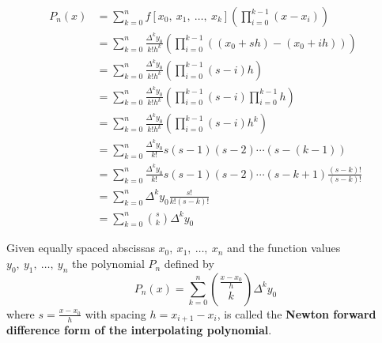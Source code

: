 \documentclass{article}
\begin{document}
\begin{align*}
    P_n\left( x \right) & = \sum_{k = 0}^n f\left[ x_0,\: x_1,\: \dots,\: x_k \right] \left( \prod_{i = 0}^{k - 1} \left( x - x_i \right) \right)                                                 \\
                        & = \sum_{k = 0}^n \frac{\Delta^k y_0}{k! h^k} \left( \prod_{i = 0}^{k - 1} \left( \left( x_0 + sh \right) - \left( x_0 + ih \right) \right) \right)                      \\
                        & = \sum_{k = 0}^n \frac{\Delta^k y_0}{k! h^k} \left( \prod_{i = 0}^{k - 1} \left( s - i \right)h \right)                                                                 \\
                        & = \sum_{k = 0}^n \frac{\Delta^k y_0}{k! h^k} \left( \prod_{i = 0}^{k - 1} \left( s - i \right) \prod_{i = 0}^{k - 1} h \right)                                          \\
                        & = \sum_{k = 0}^n \frac{\Delta^k y_0}{k! h^k} \left( \prod_{i = 0}^{k - 1} \left( s - i \right) h^k \right)                                                              \\
                        & = \sum_{k = 0}^n \frac{\Delta^k y_0}{k!} s\left( s - 1 \right) \left( s - 2 \right) \cdots \left( s - \left( k - 1 \right) \right)                                      \\
                        & = \sum_{k = 0}^n \frac{\Delta^k y_0}{k!} s\left( s - 1 \right) \left( s - 2 \right) \cdots \left( s - k + 1 \right) \frac{\left( s - k \right)!}{\left( s - k \right)!} \\
                        & = \sum_{k = 0}^n \Delta^k y_0 \frac{s!}{k!\left( s - k \right)!}                                                                                                        \\
                        & = \sum_{k = 0}^n \binom{s}{k} \Delta^k y_0
\end{align*}
\begin{definition}
    Given equally spaced abscissas \(x_0,\: x_1,\: \dots,\: x_n\) and the function values \(y_0,\: y_1,\: \dots,\: y_n\) the polynomial \(P_n\) defined by
    \begin{equation*}
        P_n\left( x \right) = \sum_{k = 0}^n \binom{\frac{x - x_0}{h}}{k} \Delta^k y_0
    \end{equation*}
    where \(s = \frac{x - x_0}{h}\) with spacing \(h = x_{i + 1} - x_i\), is called the \textbf{Newton forward difference form of the interpolating polynomial}.
\end{definition}
\end{document}
